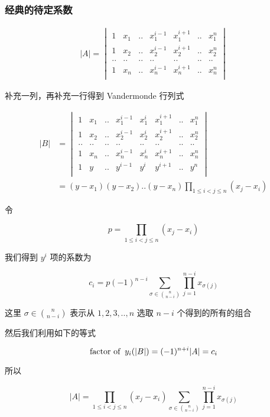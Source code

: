 \documentclass[12pt,a4paper]{ctexart}
\begin{document}
\subsubsection{经典的待定系数}

\begin{align*}
    |A| = \begin{vmatrix}
        1 & x_1 & .. & x_1^{i-1} & x_1^{i+1} & .. & x_1^n \\
        1 & x_2 & .. & x_2^{i-1} & x_2^{i+1} & .. & x_2^n \\
         .. & ..& ..& ..& ..& ..& .. \\
        1 & x_n & .. & x_n^{i-1} & x_n^{i+1} & .. & x_n^n \\
    \end{vmatrix}
\end{align*}

补充一列，再补充一行得到 Vandermonde 行列式

\begin{align*}
|B| &= \begin{vmatrix}
1 & x_1 & .. & x_1^{i-1} & x_1^{i} & x_1^{i+1} & .. & x_1^n \\ 
1 & x_2 & .. & x_2^{i-1} & x_2^{i} & x_2^{i+1} & .. & x_2^n \\ 
.. &.. &.. &.. &.. &.. & .. & .. \\
1 & x_n & .. & x_n^{i-1} & x_n^{i} & x_n^{i+1} & .. & x_n^n \\ 
1 & y & .. & y^{i-1} & y^{i} & y^{i+1} & .. & y^n \\ 
\end{vmatrix} \\
&= (y-x_1)(y-x_2)..(y-x_n) \prod_{1 \le i < j \le n}\left(x_j - x_i\right)
\end{align*}

令

\[
p = \prod_{1 \le i < j \le n}\left(x_j - x_i\right)
\]

我们得到 $y^i$ 项的系数为

\[
c_i= p(-1)^{n-i}\sum_{\sigma \in \binom{n}{n-i}}\prod_{j=1}^{n-i}x_{\sigma(j)}
\]

这里 $\sigma \in \binom{n}{n-i}$ 表示从 $1,2,3,..,n$ 选取 $n-i$ 个得到的所有的组合

然后我们利用如下的等式

\[
\text{factor of \:}y_i(|B|) = (-1)^{n+i}|A| = c_i
\]

所以

\[
|A| = \prod_{1 \le i < j \le n}\left(x_j - x_i\right)\sum_{\sigma \in \binom{n}{n-i}}\prod_{j=1}^{n-i}x_{\sigma(j)}
\]
\end{document}
